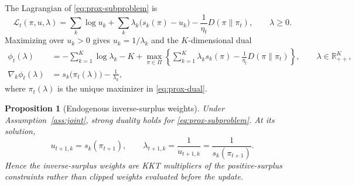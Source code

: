 \documentclass{article}
\newtheorem{proposition}{Proposition}
\theoremstyle{remark}
\theoremstyle{plain}
\newcommand{\R}{\mathbb{R}}
\begin{document}
The Lagrangian of \eqref{eq:prox-subproblem} is
\begin{equation}
\mathcal L_t(\pi,u,\lambda)
=
\sum_k\log u_k
+
\sum_k\lambda_k\big(s_k(\pi)-u_k\big)
-
\frac{1}{\eta_t}D(\pi\|\pi_t),
\qquad \lambda\ge0.
\label{eq:prox-lagrangian}
\end{equation}
Maximizing over $u_k>0$ gives $u_k=1/\lambda_k$ and the $K$-dimensional dual
\begin{align}
\phi_t(\lambda)
&=-\sum_{k=1}^K\log\lambda_k-K
+
\max_{\pi\in\Pi}
\left\{
\sum_{k=1}^K\lambda_k s_k(\pi)
-
\frac{1}{\eta_t}D(\pi\|\pi_t)
\right\},
\qquad \lambda\in\R_{++}^K,
\label{eq:prox-dual}\\
\nabla_k\phi_t(\lambda)
&=s_k\big(\pi_t(\lambda)\big)-\frac{1}{\lambda_k},
\label{eq:dual-gradient}
\end{align}
where $\pi_t(\lambda)$ is the unique maximizer in \eqref{eq:prox-dual}.

\begin{proposition}[Endogenous inverse-surplus weights]
\label{prop:prox-dual}
Under Assumption~\ref{ass:joint}, strong duality holds for \eqref{eq:prox-subproblem}. At its solution,
\begin{equation}
 u_{t+1,k}=s_k(\pi_{t+1}),
 \qquad
 \lambda_{t+1,k}=\frac{1}{u_{t+1,k}}
 =\frac{1}{s_k(\pi_{t+1})}.
\label{eq:kkt-weights}
\end{equation}
Hence the inverse-surplus weights are KKT multipliers of the positive-surplus constraints rather than clipped weights evaluated before the update.
\end{proposition}
\end{document}
